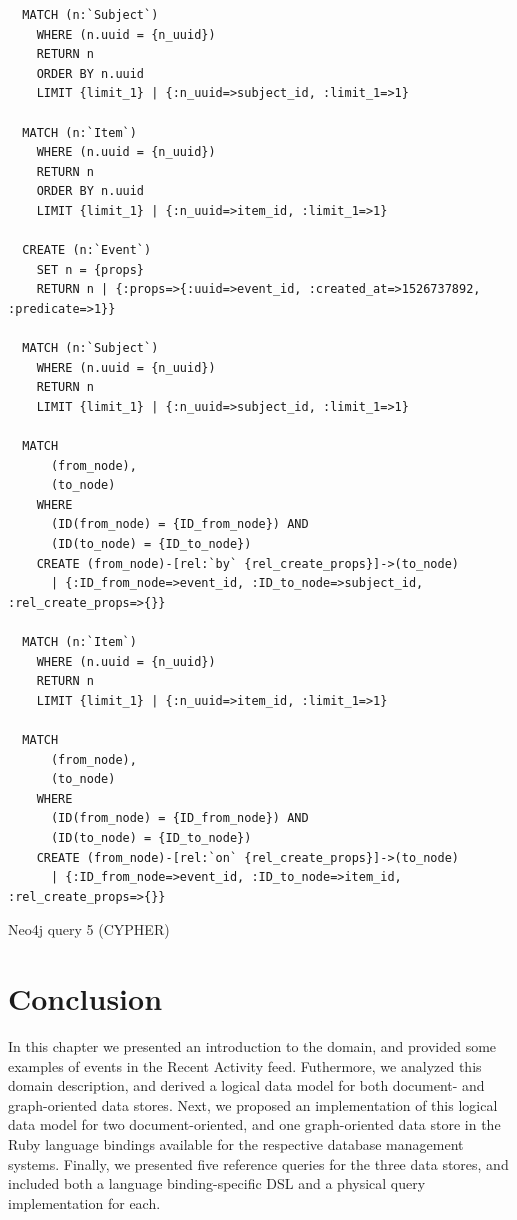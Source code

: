 \begin{listing}[H]
  \begin{verbatim}
  MATCH (n:`Subject`)
    WHERE (n.uuid = {n_uuid})
    RETURN n
    ORDER BY n.uuid
    LIMIT {limit_1} | {:n_uuid=>subject_id, :limit_1=>1}

  MATCH (n:`Item`)
    WHERE (n.uuid = {n_uuid})
    RETURN n
    ORDER BY n.uuid
    LIMIT {limit_1} | {:n_uuid=>item_id, :limit_1=>1}

  CREATE (n:`Event`)
    SET n = {props}
    RETURN n | {:props=>{:uuid=>event_id, :created_at=>1526737892, :predicate=>1}}

  MATCH (n:`Subject`)
    WHERE (n.uuid = {n_uuid})
    RETURN n
    LIMIT {limit_1} | {:n_uuid=>subject_id, :limit_1=>1}

  MATCH
      (from_node),
      (to_node)
    WHERE
      (ID(from_node) = {ID_from_node}) AND
      (ID(to_node) = {ID_to_node})
    CREATE (from_node)-[rel:`by` {rel_create_props}]->(to_node)
      | {:ID_from_node=>event_id, :ID_to_node=>subject_id, :rel_create_props=>{}}

  MATCH (n:`Item`)
    WHERE (n.uuid = {n_uuid})
    RETURN n
    LIMIT {limit_1} | {:n_uuid=>item_id, :limit_1=>1}

  MATCH
      (from_node),
      (to_node)
    WHERE
      (ID(from_node) = {ID_from_node}) AND
      (ID(to_node) = {ID_to_node})
    CREATE (from_node)-[rel:`on` {rel_create_props}]->(to_node)
      | {:ID_from_node=>event_id, :ID_to_node=>item_id, :rel_create_props=>{}}
  \end{verbatim}

  \caption{Neo4j query 5 (CYPHER)}
  \label{lst:neo4j-query-5-cypher}
\end{listing}

\section{Conclusion}
\label{sec:data-model-conclusion}

In this chapter we presented an introduction to the domain, and provided some examples of events in the Recent Activity feed.
Futhermore, we analyzed this domain description, and derived a logical data model for both document- and graph-oriented data stores.
Next, we proposed an implementation of this logical data model for two document-oriented, and one graph-oriented data store in the Ruby language bindings available for the respective database management systems.
Finally, we presented five reference queries for the three data stores, and included both a language binding-specific DSL and a physical query implementation for each.

